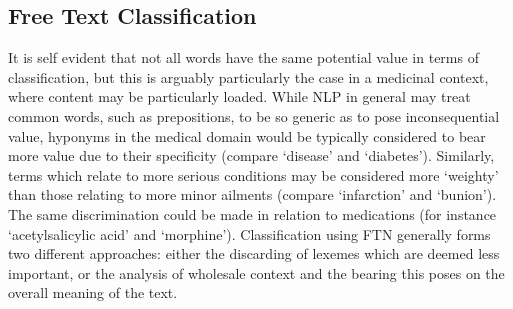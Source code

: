 \begin{comment}
****************************

Correlation based feature selection (CFS)
Variables Importance (VImp)
Recursive Feature Elimination (RFE)
hamming distance

post- hoc (model agnostic) explainability as opposed to ante-hoc (model specific) explainability is what you are doing. 


XAI (explainable AI)





Diseases are rare

Some disease prediction works well with parameterised data. Like height and weight, age, bloods, protein markers, medications

When it comes to narrative based histories things get a lot more difficult

Extract from these histories. What's wrong with that? Trying to account for unforeseen, or unseen types of data. Basically hard coded. Context can be important. Negex has been developed to this end.

Words like other words. Is bleeding like cut? Is hospital like emergency room? Is nurse like doctor?
\end{comment}

\subsection{Free Text Classification}

It is self evident that not all words have the same potential value in terms of classification, but this is arguably particularly the case in a medicinal context, where content may be particularly loaded. While NLP in general may treat common words, such as prepositions, to be so generic as to pose inconsequential value, hyponyms in the medical domain would be typically considered to bear more value due to their specificity (compare `disease' and `diabetes'). Similarly, terms which relate to more serious conditions may be considered more `weighty' than those relating to more minor ailments (compare `infarction' and `bunion'). The same discrimination could be made in relation to medications (for instance `acetylsalicylic acid' and `morphine'). Classification using FTN generally forms two different approaches: either the discarding of lexemes which are deemed less important, or the analysis of wholesale context and the bearing this poses on the overall meaning of the text.




